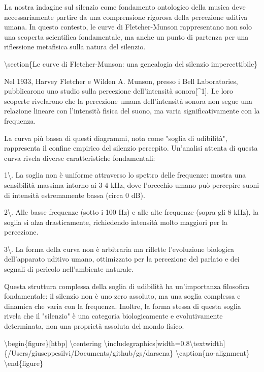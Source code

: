\documentclass[a4paper,11pt]{article}
\begin{document}
La nostra indagine sul silenzio come fondamento ontologico della musica
deve necessariamente partire da una comprensione rigorosa della
percezione uditiva umana. In questo contesto, le curve di
Fletcher-Munson rappresentano non solo una scoperta scientifica
fondamentale, ma anche un punto di partenza per una riflessione
metafisica sulla natura del silenzio.


\textbackslash{}section\{Le curve di Fletcher-Munson: una genealogia del silenzio impercettibile\}

Nel 1933, Harvey Fletcher e Wilden A. Munson, presso i Bell
Laboratories, pubblicarono uno studio sulla percezione dell'intensit\`a
sonora[\textasciicircum{}1]. Le loro scoperte rivelarono che la percezione umana
dell'intensit\`a sonora non segue una relazione lineare con l'intensit\`a
fisica del suono, ma varia significativamente con la frequenza.

La curva pi\`u bassa di questi diagrammi, nota come "soglia di udibilit\`a",
rappresenta il confine empirico del silenzio percepito. Un'analisi
attenta di questa curva rivela diverse caratteristiche fondamentali:

1\textbackslash{}. La soglia non \`e uniforme attraverso lo spettro delle frequenze:
mostra una sensibilit\`a massima intorno ai 3-4 kHz, dove l'orecchio umano
pu\`o percepire suoni di intensit\`a estremamente bassa (circa 0 dB).

2\textbackslash{}. Alle basse frequenze (sotto i 100 Hz) e alle alte frequenze (sopra
gli 8 kHz), la soglia si alza drasticamente, richiedendo intensit\`a molto
maggiori per la percezione.

3\textbackslash{}. La forma della curva non \`e arbitraria ma riflette l'evoluzione
biologica dell'apparato uditivo umano, ottimizzato per la percezione del
parlato e dei segnali di pericolo nell'ambiente naturale.

Questa struttura complessa della soglia di udibilit\`a ha un'importanza
filosofica fondamentale: il silenzio non \`e uno zero assoluto, ma una
soglia complessa e dinamica che varia con la frequenza. Inoltre, la
forma stessa di questa soglia rivela che il "silenzio" \`e una categoria
biologicamente e evolutivamente determinata, non una propriet\`a assoluta
del mondo fisico.

\textbackslash{}begin\{figure\}[htbp]
  \textbackslash{}centering
  \textbackslash{}includegraphics[width=0.8\textbackslash{}textwidth]\{/Users/giuseppesilvi/Documents/github/gs/darsena\}
  \textbackslash{}caption\{no-alignment\}
\textbackslash{}end\{figure\}
\end{document}
